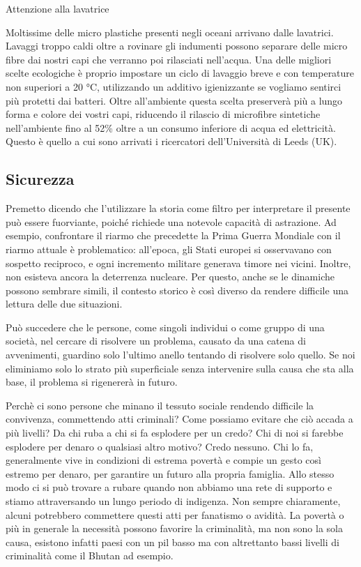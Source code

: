 \documentclass[12pt]{book} %
\begin{document}
\bigskip
\begin{mdframed}[linewidth=1pt]
Attenzione alla lavatrice

Moltissime delle micro plastiche presenti negli oceani arrivano dalle lavatrici. Lavaggi troppo caldi oltre a rovinare
gli indumenti possono separare delle micro fibre dai nostri capi che verranno poi rilasciati
nell'acqua. Una delle migliori scelte ecologiche è proprio impostare un ciclo di lavaggio breve e
con temperature non superiori a 20 °C, utilizzando un additivo igienizzante se vogliamo sentirci più protetti dai
batteri. Oltre all'ambiente questa scelta preserverà più a lungo forma e colore dei vostri capi,
riducendo il rilascio di microfibre sintetiche nell'ambiente fino al 52\% oltre a un consumo inferiore di acqua ed
elettricità. Questo è quello a cui sono arrivati i ricercatori dell'Università di Leeds
(UK).
\end{mdframed}

\subsection{Sicurezza}
Premetto dicendo che l'utilizzare la storia come filtro per interpretare il presente può essere fuorviante, poiché richiede una notevole capacità di astrazione. Ad esempio, confrontare il riarmo che precedette la Prima Guerra Mondiale con il riarmo attuale è problematico: all’epoca, gli Stati europei si osservavano con sospetto reciproco, e ogni incremento militare generava timore nei vicini. Inoltre, non esisteva ancora la deterrenza nucleare. Per questo, anche se le dinamiche possono sembrare simili, il contesto storico è così diverso da rendere difficile una lettura delle due situazioni. 

Può succedere che le persone, come singoli individui o come gruppo di una società, nel cercare
di risolvere un problema, causato da una catena di avvenimenti, guardino solo l'ultimo anello
tentando di risolvere solo quello. Se noi eliminiamo solo lo strato più superficiale senza intervenire sulla
causa che sta alla base, il problema si rigenererà in futuro.

Perchè ci sono persone che minano il tessuto sociale rendendo difficile la convivenza, commettendo atti criminali?
Come possiamo evitare che ciò accada a più livelli? Da chi ruba a chi si fa esplodere per un credo?
Chi di noi si farebbe esplodere per denaro o qualsiasi altro motivo? Credo nessuno.
Chi lo fa, generalmente vive in condizioni di estrema povertà e compie un gesto così estremo per denaro, per garantire un futuro alla propria famiglia.
Allo stesso modo ci si può trovare a rubare quando non abbiamo una rete di supporto e stiamo attraversando un lungo periodo di indigenza.
Non sempre chiaramente, alcuni potrebbero commettere questi atti per fanatismo o avidità.
La povertà o più in generale la necessità possono favorire la criminalità, ma non sono la sola causa, esistono infatti paesi con un pil basso ma con altrettanto bassi livelli di criminalità come il Bhutan ad esempio.
\end{document}

